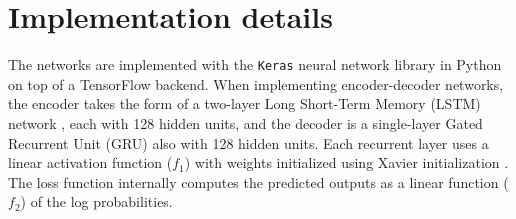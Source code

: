 
\newtheorem*{assumption*}{\assumptionnumber}
\providecommand{\assumptionnumber}{}
\makeatletter
\newenvironment{assumption}[2]
{%
	\renewcommand{\assumptionnumber}{Assumption #1}%
	\begin{assumption*}%
		\protected@edef\@currentlabel{#1}%
	}
	{%
	\end{assumption*}
}
\makeatother

\newcommand{\Adv}{{\mathbf{Adv}}}       
\newcommand{\prp}{{\mathrm{prp}}}                  %
\newcommand{\calK}{{\cal K}}
\newcommand{\outputs}{{\Rightarrow}}                
\newcommand{\getsr}{{\:\stackrel{{\scriptscriptstyle\hspace{0.2em}\$}}{\leftarrow}\:}}
\newcommand{\andthen}{{\::\;\;}}    %
\newcommand{\Rand}[1]{{\mathrm{Rand}[{#1}]}}       %
\newcommand{\Perm}[1]{{\mathrm{Perm}[{#1}]}}       
\newcommand{\Randd}[2]{{\mathrm{Rand}[{#1},{#2}]}} %
\newcommand{\E}{\mathrm{E}}
\newcommand{\Var}{\mathrm{Var}}
\newcommand{\Cov}{\mathrm{Cov}}
\DeclareMathOperator*{\plim}{plim}
\newcommand\independent{\protect\mathpalette{\protect\independenT}{\perp}}
\def\independenT#1#2{\mathrel{\rlap{$#1#2$}\mkern2mu{#1#2}}}
\newcommand{\possessivecite}[1]{\citeauthor{#1}'s [\citeyear{#1}]} 

\renewcommand*\contentsname{Table of contents}




\begin{singlespacing}
\maketitle \thispagestyle{empty}
\tableofcontents \thispagestyle{empty}
\end{singlespacing}


\pagebreak
{}%

\section{Implementation details} \label{imp}

The networks are implemented with the \texttt{Keras} neural network library \citep{chollet2015keras} in Python on top of a TensorFlow backend. When implementing encoder-decoder networks, the encoder takes the form of a two-layer Long Short-Term Memory (LSTM) network \citep{schmidhuber1997long}, each with 128 hidden units, and the decoder is a single-layer Gated Recurrent Unit (GRU) \citep{chung2014} also with 128 hidden units. Each recurrent layer uses a linear activation function ($f_1$) with weights initialized using Xavier initialization \citep{glorot2010}. The loss function internally computes the predicted outputs as a linear function ($f_2$) of the log probabilities. 

